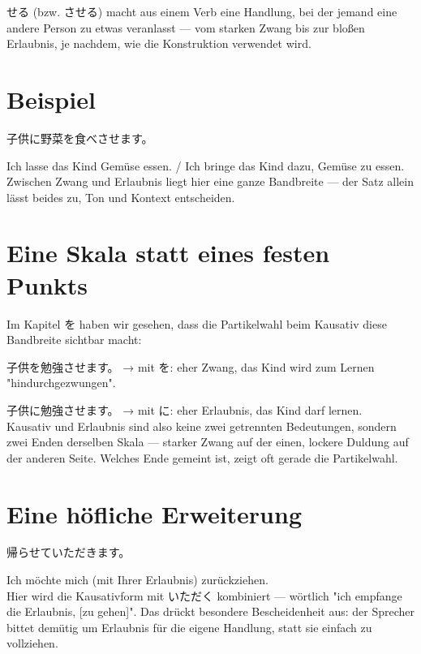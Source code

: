 \documentclass[12pt]{book}
\begin{document}
せる (bzw. させる) macht aus einem Verb eine Handlung, bei der jemand eine andere Person zu etwas veranlasst — vom starken Zwang bis zur bloßen Erlaubnis, je nachdem, wie die Konstruktion verwendet wird.

\section*{Beispiel}

\par\quad 子供に野菜を食べさせます。\\
\par\quad Ich lasse das Kind Gemüse essen. / Ich bringe das Kind dazu, Gemüse zu essen.\\

Zwischen Zwang und Erlaubnis liegt hier eine ganze Bandbreite — der Satz allein lässt beides zu, Ton und Kontext entscheiden.

\section*{Eine Skala statt eines festen Punkts}

Im Kapitel を haben wir gesehen, dass die Partikelwahl beim Kausativ diese Bandbreite sichtbar macht:

\par\quad 子供を勉強させます。 → mit を: eher Zwang, das Kind wird zum Lernen "hindurchgezwungen".\\
\par\quad 子供に勉強させます。 → mit に: eher Erlaubnis, das Kind darf lernen.\\

Kausativ und Erlaubnis sind also keine zwei getrennten Bedeutungen, sondern zwei Enden derselben Skala — starker Zwang auf der einen, lockere Duldung auf der anderen Seite. Welches Ende gemeint ist, zeigt oft gerade die Partikelwahl.

\section*{Eine höfliche Erweiterung}

\par\quad 帰らせていただきます。\\
\par\quad Ich möchte mich (mit Ihrer Erlaubnis) zurückziehen.\\

Hier wird die Kausativform mit いただく kombiniert — wörtlich "ich empfange die Erlaubnis, [zu gehen]". Das drückt besondere Bescheidenheit aus: der Sprecher bittet demütig um Erlaubnis für die eigene Handlung, statt sie einfach zu vollziehen.
\end{document}
